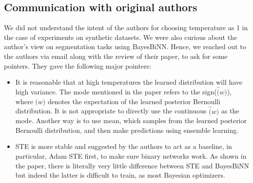 \subsection{Communication with original authors}
We did not understand the intent of the authors for choosing temperature as 1 in the case of experiments on synthetic datasets. We were also curious about the author's view on segmentation tasks using BayesBiNN. Hence, we reached out to the authors via email along with the review of their paper, to ask for some pointers. They gave the following major pointers:
\begin{itemize}
    \item It is reasonable that at high temperatures the learned distribution will have high variance. The mode mentioned in the paper refers to the sign($\hat(w)$), where $\hat(w)$ denotes the expectation of the learned posterior Bernoulli distribution. It is not appropriate to directly use the continuous $\hat(w)$ as the mode. Another way is to use mean, which samples from the learned posterior Bernoulli distribution, and then make predictions using ensemble learning.
    \item STE is more stable and suggested by the authors to act as a baseline, in particular, Adam STE first, to make sure binary networks work. As shown in the paper, there is literally very little difference between STE and BayesBiNN but indeed the latter is difficult to train, as most Bayesian optimizers.
\end{itemize}
